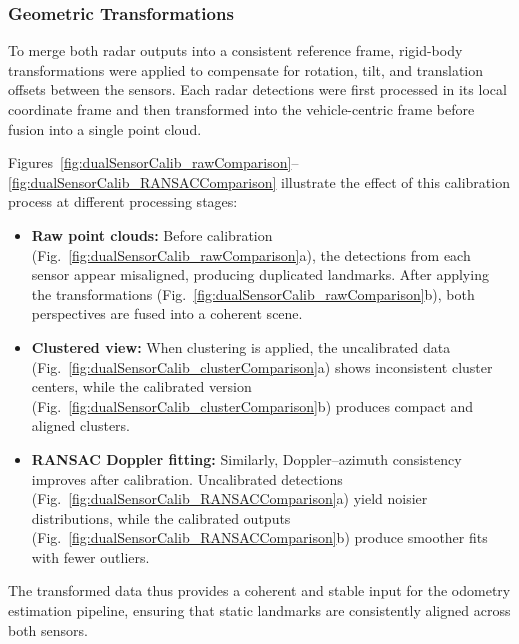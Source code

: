 \subsubsection{Geometric Transformations} 
To merge both radar outputs into a consistent reference frame, rigid-body transformations were applied to compensate for rotation, tilt, and translation offsets between the sensors. 
Each radar detections were first processed in its local coordinate frame and then transformed into the vehicle-centric frame before fusion into a single point cloud. 

Figures~\ref{fig:dualSensorCalib_rawComparison}--\ref{fig:dualSensorCalib_RANSACComparison} illustrate the effect of this calibration process at different processing stages: 
\begin{itemize} 
    \item \textbf{Raw point clouds:} Before calibration (Fig.~\ref{fig:dualSensorCalib_rawComparison}a), the detections from each sensor appear misaligned, producing duplicated landmarks. After applying the transformations (Fig.~\ref{fig:dualSensorCalib_rawComparison}b), both perspectives are fused into a coherent scene. 
    \item \textbf{Clustered view:} When clustering is applied, the uncalibrated data (Fig.~\ref{fig:dualSensorCalib_clusterComparison}a) shows inconsistent cluster centers, while the calibrated version (Fig.~\ref{fig:dualSensorCalib_clusterComparison}b) produces compact and aligned clusters. 
    \item \textbf{RANSAC Doppler fitting:} Similarly, Doppler–azimuth consistency improves after calibration. Uncalibrated detections (Fig.~\ref{fig:dualSensorCalib_RANSACComparison}a) yield noisier distributions, while the calibrated outputs (Fig.~\ref{fig:dualSensorCalib_RANSACComparison}b) produce smoother fits with fewer outliers. 
\end{itemize} 

The transformed data thus provides a coherent and stable input for the odometry estimation pipeline, ensuring that static landmarks are consistently aligned across both sensors.  

